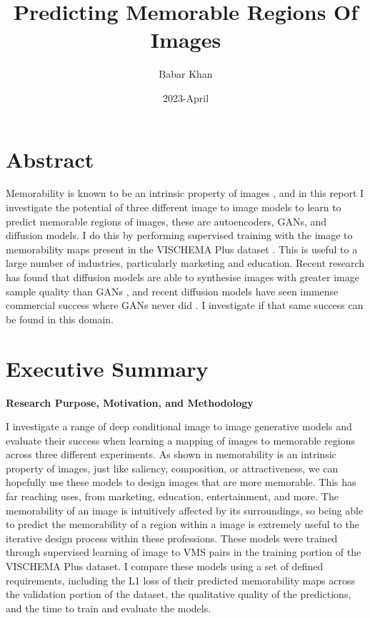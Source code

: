 \documentclass{UoYCSproject}
\author{Babar Khan}
\title{Predicting Memorable Regions Of Images}
\date{2023-April}
\begin{document}
\maketitle

\chapter{Abstract}
Memorability is known to be an intrinsic property of images \cite{Isola2011,IsolaParikhTorralbaOliva2011}, and in this report I investigate the potential of three different image to image models to learn to predict memorable regions of images, these are autoencoders, GANs, and diffusion models. I do this by performing supervised training with the image to memorability maps present in the VISCHEMA Plus dataset \cite{VischemaPaper}. This is useful to a large number of industries, particularly marketing and education. Recent research has found that diffusion models are able to synthesise images with greater image sample quality than GANs \cite{dhariwal2021diffusion}, and recent diffusion models have seen immense commercial success where GANs never did \cite{ramesh2022hierarchical, saharia2022photorealistic}. I investigate if that same success can be found in this domain.
 
\chapter{Executive Summary}




\textbf{Research Purpose, Motivation, and Methodology}

I investigate a range of deep conditional image to image generative models and evaluate their success when learning a mapping of images to memorable regions across three different experiments. 
As shown in \cite{Isola2011,IsolaParikhTorralbaOliva2011}
memorability is an intrinsic property of images, just like saliency, composition, or attractiveness, we can hopefully use these models to design images that are more memorable. This has far reaching uses, from marketing, education, entertainment, and more. The memorability of an image is intuitively affected by its surroundings, so being able to predict the memorability of a region within a image is extremely useful to the iterative design process within these professions.  
These models were trained through supervised learning of image to VMS pairs in the training portion of the VISCHEMA Plus dataset. I compare these models using a set of defined requirements, including the L1 loss of their predicted memorability maps across the validation portion of the dataset, the qualitative quality of the predictions, and the time to train and evaluate the models.
\end{document}
